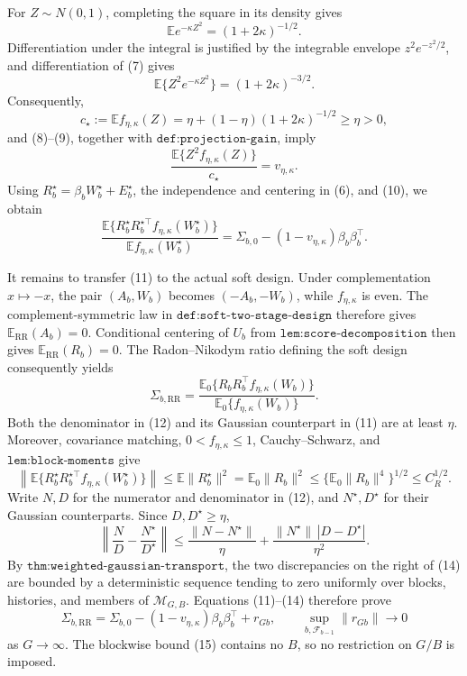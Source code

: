 For \(Z\sim N(0,1)\), completing the square in its density gives
\[
\mathbb E e^{-\kappa Z^2}=(1+2\kappa)^{-1/2}.
\tag{7}
\]
Differentiation under the integral is justified by the integrable envelope \(z^2e^{-z^2/2}\), and differentiation of (7) gives
\[
\mathbb E\{Z^2e^{-\kappa Z^2}\}=(1+2\kappa)^{-3/2}.
\tag{8}
\]
Consequently,
\[
c_\star:=\mathbb Ef_{\eta,\kappa}(Z)
=\eta+(1-\eta)(1+2\kappa)^{-1/2}\ge\eta>0,
\tag{9}
\]
and (8)--(9), together with \(\texttt{def:projection-gain}\), imply
\[
\frac{\mathbb E\{Z^2f_{\eta,\kappa}(Z)\}}{c_\star}=v_{\eta,\kappa}.
\tag{10}
\]
Using \(R_b^\star=\beta_bW_b^\star+E_b^\star\), the independence and centering in (6), and (10), we obtain
\[
\frac{\mathbb E\{R_b^\star R_b^{\star\top}f_{\eta,\kappa}(W_b^\star)\}}
     {\mathbb Ef_{\eta,\kappa}(W_b^\star)}
=\Sigma_{b,0}-(1-v_{\eta,\kappa})\beta_b\beta_b^\top.
\tag{11}
\]

It remains to transfer (11) to the actual soft design.  Under complementation \(x\mapsto-x\), the pair \((A_b,W_b)\) becomes \((-A_b,-W_b)\), while \(f_{\eta,\kappa}\) is even.  The complement-symmetric law in \(\texttt{def:soft-two-stage-design}\) therefore gives \(\mathbb E_{\mathrm{RR}}(A_b)=0\).  Conditional centering of \(U_b\) from \(\texttt{lem:score-decomposition}\) then gives \(\mathbb E_{\mathrm{RR}}(R_b)=0\).  The Radon--Nikodym ratio defining the soft design consequently yields
\[
\Sigma_{b,\mathrm{RR}}
=\frac{\mathbb E_0\{R_bR_b^\top f_{\eta,\kappa}(W_b)\}}
       {\mathbb E_0\{f_{\eta,\kappa}(W_b)\}}.
\tag{12}
\]
Both the denominator in (12) and its Gaussian counterpart in (11) are at least \(\eta\).  Moreover, covariance matching, \(0<f_{\eta,\kappa}\le1\), Cauchy--Schwarz, and \(\texttt{lem:block-moments}\) give
\[
\left\|\mathbb E\{R_b^\star R_b^{\star\top}f_{\eta,\kappa}(W_b^\star)\}\right\|
\le \mathbb E\|R_b^\star\|^2
=\mathbb E_0\|R_b\|^2
\le\{\mathbb E_0\|R_b\|^4\}^{1/2}
\le C_R^{1/2}.
\tag{13}
\]
Write \(N,D\) for the numerator and denominator in (12), and \(N^\star,D^\star\) for their Gaussian counterparts.  Since \(D,D^\star\ge\eta\),
\[
\left\|\frac ND-\frac{N^\star}{D^\star}\right\|
\le\frac{\|N-N^\star\|}{\eta}
+\frac{\|N^\star\|\,|D-D^\star|}{\eta^2}.
\tag{14}
\]
By \(\texttt{thm:weighted-gaussian-transport}\), the two discrepancies on the right of (14) are bounded by a deterministic sequence tending to zero uniformly over blocks, histories, and members of \(\mathcal M_{G,B}\).  Equations (11)--(14) therefore prove
\[
\Sigma_{b,\mathrm{RR}}
=\Sigma_{b,0}-(1-v_{\eta,\kappa})\beta_b\beta_b^\top+r_{Gb},
\qquad
\sup_{b,\mathcal F_{b-1}}\|r_{Gb}\|\longrightarrow0
\tag{15}
\]
as \(G\to\infty\).  The blockwise bound (15) contains no \(B\), so no restriction on \(G/B\) is imposed.

